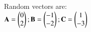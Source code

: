 \documentclass[article,12pt]{IEEEtran}
\begin{document}
\let\vec\mathbf
Random vectors are: \\
$\vec{A} =\myvec{0\\ 2}; 
\vec{B} =\myvec{-1\\ -2}; 
\vec{C} =\myvec{1\\ -3}$ \\
\else
    \def\gnumericTableEnd{}
\fi
\providecommand{\gnumericmathit}[1]{#1} 
\providecommand{\gnumericPB}[1]%
{\let\gnumericTemp=\\#1\let\\=\gnumericTemp\hspace{0pt}}
        \newlength{\gnumericTableWidth}
        \newlength{\gnumericTableWidthComplete}
        \newlength{\gnumericMultiRowLength}
        \global\def\gnumericTableWidthDefined{}
 \fi
\providecommand\gnumbox{\makebox[0pt]}
\end{document}
